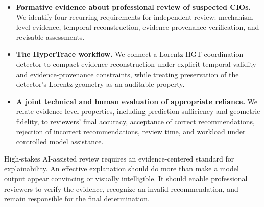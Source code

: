 \begin{itemize}
    \item \textbf{Formative evidence about professional review of suspected CIOs.} We identify four recurring requirements for independent review: mechanism-level evidence, temporal reconstruction, evidence-provenance verification, and revisable assessments.

    \item \textbf{The HyperTrace workflow.} We connect a Lorentz-HGT coordination detector to compact evidence reconstruction under explicit temporal-validity and evidence-provenance constraints, while treating preservation of the detector's Lorentz geometry as an auditable property.

    \item \textbf{A joint technical and human evaluation of appropriate reliance.} We relate evidence-level properties, including prediction sufficiency and geometric fidelity, to reviewers' final accuracy, acceptance of correct recommendations, rejection of incorrect recommendations, review time, and workload under controlled model assistance.
\end{itemize}

High-stakes AI-assisted review requires an evidence-centered standard for explainability. An effective explanation should do more than make a model output appear convincing or visually intelligible. It should enable professional reviewers to verify the evidence, recognize an invalid recommendation, and remain responsible for the final determination.
